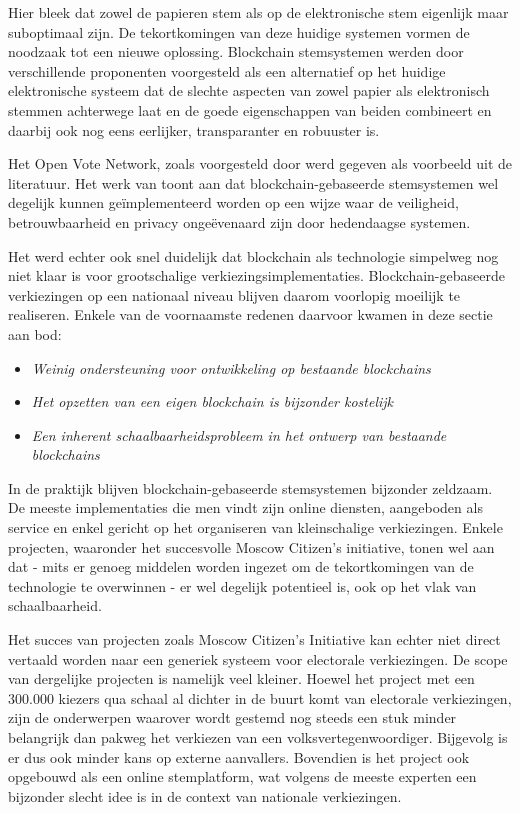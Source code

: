 	Hier bleek dat zowel de papieren stem als op de elektronische stem eigenlijk maar suboptimaal zijn. De tekortkomingen van deze huidige systemen vormen de noodzaak tot een nieuwe oplossing. Blockchain stemsystemen werden door verschillende proponenten voorgesteld als een alternatief op het huidige elektronische systeem dat de slechte aspecten van zowel papier als elektronisch stemmen achterwege laat en de goede eigenschappen van beiden combineert en daarbij ook nog eens eerlijker, transparanter en robuuster is.
	
	Het Open Vote Network, zoals voorgesteld door \textcite{McCorry2017} werd gegeven als voorbeeld uit de literatuur. Het werk van \textcite{McCorry2017} toont aan dat blockchain-gebaseerde stemsystemen wel degelijk kunnen geïmplementeerd worden op een wijze waar de veiligheid, betrouwbaarheid en privacy ongeëvenaard zijn door hedendaagse systemen.
	
	Het werd echter ook snel duidelijk dat blockchain als technologie simpelweg nog niet klaar is voor grootschalige verkiezingsimplementaties. Blockchain-gebaseerde verkiezingen op een nationaal niveau blijven daarom voorlopig moeilijk te realiseren.  Enkele van de voornaamste redenen daarvoor kwamen in deze sectie aan bod:
	\begin{itemize}
		\item\textit{Weinig ondersteuning voor ontwikkeling op bestaande blockchains}
		\item\textit{Het opzetten van een eigen blockchain is bijzonder kostelijk}
		\item\textit{Een inherent schaalbaarheidsprobleem in het ontwerp van bestaande blockchains}
	\end{itemize}
	In de praktijk blijven blockchain-gebaseerde stemsystemen bijzonder zeldzaam. De meeste  implementaties die men vindt zijn online diensten, aangeboden als service en enkel gericht op het organiseren van kleinschalige verkiezingen. Enkele projecten, waaronder het succesvolle Moscow Citizen's initiative, tonen wel aan dat - mits er  genoeg middelen worden ingezet om de tekortkomingen van de technologie te overwinnen - er wel degelijk potentieel is, ook op het vlak van schaalbaarheid.
	
	Het succes van projecten zoals Moscow Citizen's Initiative kan echter niet direct vertaald worden naar een generiek systeem voor electorale verkiezingen. De scope van dergelijke projecten is namelijk veel kleiner. Hoewel het project met een 300.000 kiezers qua schaal al dichter in de buurt komt van electorale verkiezingen, zijn de onderwerpen waarover wordt gestemd nog steeds een stuk minder belangrijk dan pakweg het verkiezen van een volksvertegenwoordiger. Bijgevolg is er dus ook minder kans op externe aanvallers. Bovendien is het project ook opgebouwd als een online stemplatform, wat volgens de meeste experten een bijzonder slecht idee is in de context van nationale verkiezingen.
	

